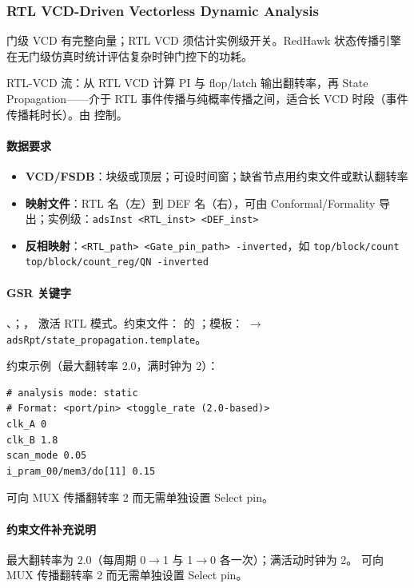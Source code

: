 \subsubsection*{RTL VCD-Driven Vectorless Dynamic Analysis}

门级 VCD 有完整向量；RTL VCD 须估计实例级开关。RedHawk 状态传播引擎在无门级仿真时统计评估复杂时钟门控下的功耗。

RTL-VCD 流：从 RTL VCD 计算 PI 与 flop/latch 输出翻转率，再 State Propagation——介于 RTL 事件传播与纯概率传播之间，适合长 VCD 时段（事件传播耗时长）。由  控制。

\paragraph{数据要求}
\begin{itemize}
  \item \textbf{VCD/FSDB}：块级或顶层；可设时间窗；缺省节点用约束文件或默认翻转率
  \item \textbf{映射文件}：RTL 名（左）到 DEF 名（右），可由 Conformal/Formality 导出；实例级：\texttt{adsInst <RTL\_inst> <DEF\_inst>}
  \item \textbf{反相映射}：\texttt{<RTL\_path> <Gate\_pin\_path> -inverted}，如 \texttt{top/block/count top/block/count\_reg/QN -inverted}
\end{itemize}

\paragraph{GSR 关键字}
、；， 激活 RTL 模式。约束文件： 的 ；模板： $\rightarrow$ \texttt{adsRpt/state\_propagation.template}。

约束示例（最大翻转率 2.0，满时钟为 2）：
\begin{lstlisting}
# analysis mode: static
# Format: <port/pin> <toggle_rate (2.0-based)>
clk_A 0
clk_B 1.8
scan_mode 0.05
i_pram_00/mem3/do[11] 0.15
\end{lstlisting}

 可向 MUX 传播翻转率 2 而无需单独设置 Select pin。
\paragraph{约束文件补充说明}
最大翻转率为 2.0（每周期 0$\rightarrow$1 与 1$\rightarrow$0 各一次）；满活动时钟为 2。 可向 MUX 传播翻转率 2 而无需单独设置 Select pin。

